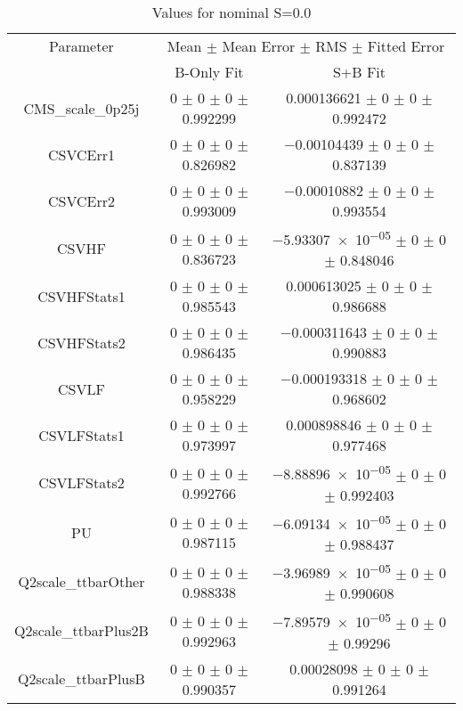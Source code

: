 \begin{table}
\centering
\caption{Values for nominal S=0.0}
\begin{tabular}{ccc}
\toprule
Parameter & \multicolumn{2}{c}{Mean $\pm$ Mean Error $\pm$ RMS $\pm$ Fitted Error}\\
 & B-Only Fit & S+B Fit\\
\midrule
CMS\_scale\_0p25j & \num{0} $\pm$ \num{0} $\pm$ \num{0} $\pm$ \num{0.992299} & \num{0.000136621} $\pm$ \num{0} $\pm$ \num{0} $\pm$ \num{0.992472}\\
CSVCErr1 & \num{0} $\pm$ \num{0} $\pm$ \num{0} $\pm$ \num{0.826982} & \num{-0.00104439} $\pm$ \num{0} $\pm$ \num{0} $\pm$ \num{0.837139}\\
CSVCErr2 & \num{0} $\pm$ \num{0} $\pm$ \num{0} $\pm$ \num{0.993009} & \num{-0.00010882} $\pm$ \num{0} $\pm$ \num{0} $\pm$ \num{0.993554}\\
CSVHF & \num{0} $\pm$ \num{0} $\pm$ \num{0} $\pm$ \num{0.836723} & \num{-5.93307e-05} $\pm$ \num{0} $\pm$ \num{0} $\pm$ \num{0.848046}\\
CSVHFStats1 & \num{0} $\pm$ \num{0} $\pm$ \num{0} $\pm$ \num{0.985543} & \num{0.000613025} $\pm$ \num{0} $\pm$ \num{0} $\pm$ \num{0.986688}\\
CSVHFStats2 & \num{0} $\pm$ \num{0} $\pm$ \num{0} $\pm$ \num{0.986435} & \num{-0.000311643} $\pm$ \num{0} $\pm$ \num{0} $\pm$ \num{0.990883}\\
CSVLF & \num{0} $\pm$ \num{0} $\pm$ \num{0} $\pm$ \num{0.958229} & \num{-0.000193318} $\pm$ \num{0} $\pm$ \num{0} $\pm$ \num{0.968602}\\
CSVLFStats1 & \num{0} $\pm$ \num{0} $\pm$ \num{0} $\pm$ \num{0.973997} & \num{0.000898846} $\pm$ \num{0} $\pm$ \num{0} $\pm$ \num{0.977468}\\
CSVLFStats2 & \num{0} $\pm$ \num{0} $\pm$ \num{0} $\pm$ \num{0.992766} & \num{-8.88896e-05} $\pm$ \num{0} $\pm$ \num{0} $\pm$ \num{0.992403}\\
PU & \num{0} $\pm$ \num{0} $\pm$ \num{0} $\pm$ \num{0.987115} & \num{-6.09134e-05} $\pm$ \num{0} $\pm$ \num{0} $\pm$ \num{0.988437}\\
Q2scale\_ttbarOther & \num{0} $\pm$ \num{0} $\pm$ \num{0} $\pm$ \num{0.988338} & \num{-3.96989e-05} $\pm$ \num{0} $\pm$ \num{0} $\pm$ \num{0.990608}\\
Q2scale\_ttbarPlus2B & \num{0} $\pm$ \num{0} $\pm$ \num{0} $\pm$ \num{0.992963} & \num{-7.89579e-05} $\pm$ \num{0} $\pm$ \num{0} $\pm$ \num{0.99296}\\
Q2scale\_ttbarPlusB & \num{0} $\pm$ \num{0} $\pm$ \num{0} $\pm$ \num{0.990357} & \num{0.00028098} $\pm$ \num{0} $\pm$ \num{0} $\pm$ \num{0.991264}\\

\end{tabular}
\end{table}
